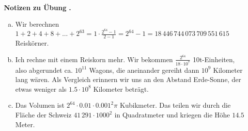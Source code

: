 \documentclass[%
11pt,%
twoside,%
titlepage,%
swissgerman,%
headsepline%
]{scrartcl}
\newcommand{\faReturnGray}{\textcolor{gray}{\faMailReply}} %
\theoremstyle{definition}
\theoremstyle{plain}
\newcommand{\concatueb}[1]{ueb:#1}%
\newcommand{\concatlsg}[1]{lsg:#1}%
\newcounter{uebcounter}[section]
\renewcommand{\theuebcounter}{\thesection.\arabic{uebcounter}}  %
\newenvironment{lsg}[1]{%
    \par\noindent\textbf{Notizen zu Übung \theuebcounter\label{\concatlsg{#1}}}
    \hfill\hyperref[\concatueb{#1}]{\faReturnGray}\par %
}{%
    \par%
}
\begin{document}
\begin{lsg}{reiskoerner}
    \begin{enumerate}[a)]
        \item Wir berechnen $1+2+4+8+\dots+2^{63}=1\cdot\frac{2^{64}-1}{2-1}=2^{64}-1=18\,446\,744\,073\,709\,551\,615$ Reiskörner.
        \item Ich rechne mit einem Reiskorn mehr. Wir bekommen $\frac{2^{64}}{18\cdot10^7}$ 10t-Einheiten, also abgerundet ca. $10^{11}$ Wagons, die aneinander gereiht dann $10^{9}$ Kilometer lang wären. Als Vergleich erinnern wir uns an den Abstand Erde-Sonne, der etwas weniger als $1.5\cdot10^8$ Kilometer beträgt.
        \item Das Volumen ist $2^{64}\cdot0.01\cdot0.001^2\pi$ Kubikmeter. Das teilen wir durch die Fläche der Schweiz $41\,291\cdot1000^2$ in Quadratmeter und kriegen die Höhe $14.5$ Meter.
    \end{enumerate}
\end{lsg}
\end{document}
